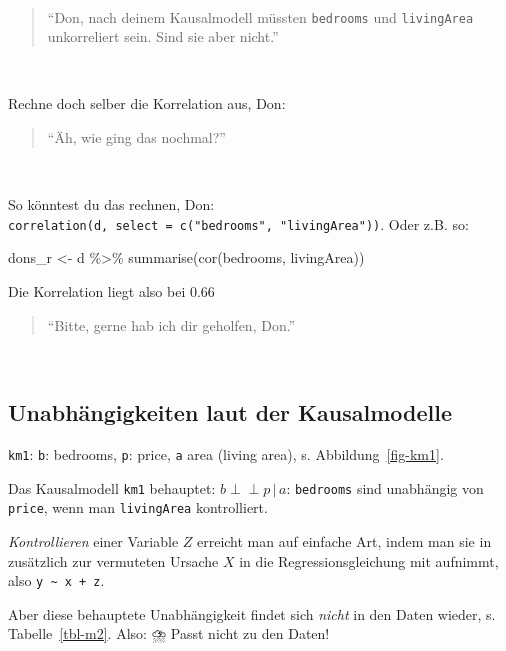 \documentclass[
  a4paper,
  DIV=11]{scrreprt}
\newenvironment{Shaded}{\begin{snugshade}}{\end{snugshade}}
\newcommand{\FunctionTok}[1]{\textcolor[rgb]{0.28,0.35,0.67}{#1}}
\newcommand{\NormalTok}[1]{\textcolor[rgb]{0.00,0.23,0.31}{#1}}
\newcommand{\OtherTok}[1]{\textcolor[rgb]{0.00,0.23,0.31}{#1}}
\newcommand{\SpecialCharTok}[1]{\textcolor[rgb]{0.37,0.37,0.37}{#1}}
\theoremstyle{definition}
\theoremstyle{remark}
\begin{document}
🧑

\begin{quote}
``Don, nach deinem Kausalmodell müssten \texttt{bedrooms} und
\texttt{livingArea} unkorreliert sein. Sind sie aber nicht.''
\end{quote}

🧑

Rechne doch selber die Korrelation aus, Don:

\begin{quote}
``Äh, wie ging das nochmal?''
\end{quote}

🧑

So könntest du das rechnen, Don:
\texttt{correlation(d,\ select\ =\ c("bedrooms",\ "livingArea"))}. Oder
z.B. so:

\begin{Shaded}
\begin{Highlighting}[]
\NormalTok{dons\_r }\OtherTok{\textless{}{-}}\NormalTok{ d }\SpecialCharTok{\%\textgreater{}\%} 
  \FunctionTok{summarise}\NormalTok{(}\FunctionTok{cor}\NormalTok{(bedrooms, livingArea))}
\end{Highlighting}
\end{Shaded}

Die Korrelation liegt also bei 0.66

\begin{quote}
``Bitte, gerne hab ich dir geholfen, Don.''
\end{quote}

👩

\hypertarget{unabhuxe4ngigkeiten-laut-der-kausalmodelle}{%
\subsection{Unabhängigkeiten laut der
Kausalmodelle}\label{unabhuxe4ngigkeiten-laut-der-kausalmodelle}}

\texttt{km1}: \texttt{b}: bedrooms, \texttt{p}: price, \texttt{a} area
(living area), s. Abbildung~\ref{fig-km1}.

Das Kausalmodell \texttt{km1} behauptet:
\(b \perp \!\!\! \perp p \, |\, a\): \texttt{bedrooms} sind unabhängig
von \texttt{price}, wenn man \texttt{livingArea} kontrolliert.

\emph{Kontrollieren} einer Variable \(Z\) erreicht man auf einfache Art,
indem man sie in zusätzlich zur vermuteten Ursache \(X\) in die
Regressionsgleichung mit aufnimmt, also
\texttt{y\ \textasciitilde{}\ x\ +\ z}.

Aber diese behauptete Unabhängigkeit findet sich \emph{nicht} in den
Daten wieder, s. Tabelle~\ref{tbl-m2}. Also: ⛈️ Passt nicht zu den
Daten!
\end{document}
